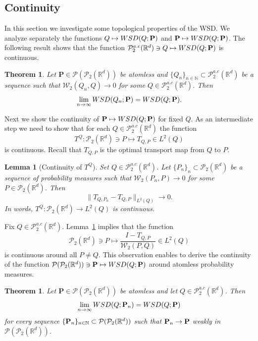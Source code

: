 \documentclass{imsart}
\newtheorem {Lemma}[Proposition] {Lemma}
\newtheorem {Theorem}[Proposition]{Theorem}
\numberwithin{equation}{section}
\def\N{\mathbb{N}}
\def\R{\mathbb{R}}
\def\N{\mathbb N}
\begin{document}
\subsection{Continuity}\label{Sec:Continuity}
In this section we investigate some topological properties of the WSD.
We analyze separately the functions $Q\mapsto  {\rm WSD}(Q; {\bf P})$ and ${\bf P}\mapsto  {\rm WSD}(Q; {\bf P})$. The following result shows that the function $\mathcal{P}_2^{a.c}(\R^d)\ni Q\mapsto  {\rm WSD}(Q; {\bf P})$ is continuous.  
\begin{Theorem}\label{Theo:COnti}
	Let  $\mathbf{P}\in \mathcal{P}(\mathcal{P}_2(\R^d)) $ be atomless  and $\{Q_n\}_{n\in \N}\subset \mathcal{P}_2^{a.c}(\R^d)$  be a sequence such that $\mathcal{W}_2(Q_n,Q)\to 0$ for some $Q\in \mathcal{P}_2^{a.c}(\R^d)$. Then $$\lim_{n\to \infty}  {\rm WSD}(Q_n; {\bf P}) =  {\rm WSD}(Q; {\bf P}) .$$ 
\end{Theorem}
Next we show the continuity of ${\bf P}\mapsto  {\rm WSD}(Q; {\bf P})$ for fixed $Q$. As an intermediate step we need to show that for each $Q\in \mathcal{P}_{2}^{a.c}(\R^d)$ the function 
$$ T^Q: \mathcal{P}_2(\R^d)\ni P\mapsto T_{Q,P}\in L^2(Q)$$
is continuous. Recall that $T_{Q,P}$ is the optimal transport map from $Q$ to $P$. 

\begin{Lemma}[Continuity of $T^Q$]\label{Stabilty} Set $Q\in \mathcal{P}_2^{a.c}(\R^d)$. Let  $\{P_n\}_n\subset \mathcal{P}_2(\R^d) $ be a sequence of  probability measures such that  $\mathcal{W}_{2}(P_n, P)\to 0 $ for some $P\in \mathcal{P}_2(\R^d)$. Then $$\| T_{Q,P_n} - T_{Q,P}\|_{L^2(Q)} \to 0.$$ In words, $T^Q:\mathcal{P}_{2}(\R^d)\to L^2(Q)$ is continuous.
\end{Lemma}



Fix $Q\in \mathcal{P}_2^{a.c}(\R^d)$.  Lemma~\ref{Stabilty} implies that the function 
$$ \mathcal{P}_{2}(\R^d)\ni  P\mapsto  \frac{I-T_{Q,P} }{\mathcal{W}_2(P,Q)} \in  L^2(Q) $$
is  continuous around all $P\neq Q$. This observation enables to derive the continuity of the function 
$\mathcal{P}(\mathcal{P}_{2}(\R^d)) \ni {\bf P}\mapsto  {\rm WSD}(Q; {\bf P})$ around  atomless probability measures. 

\begin{Theorem}\label{Theorem:contP}
	Let $\mathbf{P}\in \mathcal{P}(\mathcal{P}_{2}(\R^d)) $ be atomless and let $Q\in \mathcal{P}_2^{a.c}(\R^d)$. 
	Then 
	$$\lim_{n\to \infty}  {\rm WSD}(Q; {\bf P}_n) = {\rm WSD}(Q; {\bf P}) $$
	for every sequence $\{{\bf P}_n\}_{n\in \N}\subset \mathcal{P}(\mathcal{P}_{2}(\R^d))$ such that 
	$ {\bf P}_n \rightarrow {\bf P}$ weakly in $\mathcal{P}(\mathcal{P}_{2}(\R^d))$.
\end{Theorem}
\end{document}
